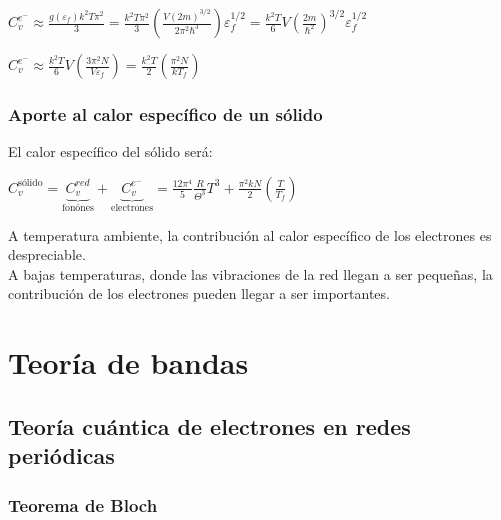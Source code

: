 \documentclass[oneside]{book}
\numberwithin{equation}{section}
\numberwithin{figure}{section}
\numberwithin{table}{section}
\begin{document}
\begin{itemize}
				\begin{center}
					$\displaystyle C_v^{e^-} \approx \frac{g(\varepsilon_f)k^2T\pi^2}{3}=\frac{k^2T\pi^2}{3}\left(\frac{V(2m)^{3/2}}{2\pi^2 \hbar^3} \right)\varepsilon_f^{1/2}=\frac{k^2T}{6}V\left(\frac{2m}{\hbar^2}\right)^{3/2}\varepsilon_f^{1/2}$
				\end{center}

				\begin{center}
					$\displaystyle C_v^{e^-} \approx \frac{k^2T}{6}V\left(\frac{3\pi^2N}{V \varepsilon_f}\right)=\frac{k^2T}{2}\left(\frac{\pi^2N}{k T_f}\right)$
				\end{center}
				
				\begin{center}
				\end{center}
				
			\end{itemize}
			\subsection{Aporte al calor específico de un sólido}
			
				El calor específico del sólido será:
				
				\begin{center}
					$\displaystyle C_v^{\text{sólido}}=\underbrace{C_v^{red}}_{\text{fonónes}}+\underbrace{C_v^{e^-}}_{\text{electrones}}=\frac{12\pi^4}{5}\frac{R}{\Theta^3}T^3+\frac{\pi^2kN}{2}\left(\frac{T}{T_f}\right)$
				\end{center}
			
				A temperatura ambiente, la contribución al calor específico de los electrones es despreciable.\\
				
				A bajas temperaturas, donde las vibraciones de la red llegan a ser pequeñas, la contribución de los electrones pueden llegar a ser importantes.
				
	\chapter{Teoría de bandas}

		\section{Teoría cuántica de electrones en redes periódicas}
	
			\subsection{Teorema de Bloch}
			
\end{document}
